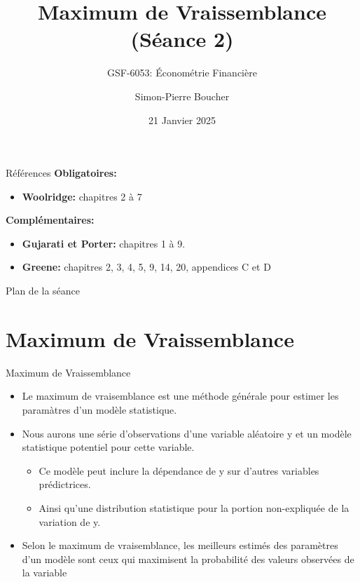 \documentclass{beamer}
\title[S02 Régression et MCO]{Maximum de Vraissemblance\\ (Séance 2)}
\subtitle{GSF-6053: Économétrie Financière}
\author[SP. Boucher]{Simon-Pierre Boucher\inst{1}}
\institute[Université Laval]
{
  \inst{1}%
  Département de finance, assurance et immobilier\\
  Faculté des sciences de l'administration\\
  Université Laval}
\date[Hiver 2025]{21 Janvier 2025}
\begin{document}
\begin{frame}
  \titlepage
\end{frame}


\begin{frame}{Références}
\textbf{Obligatoires:}
\begin{itemize}
\item \textbf{Woolridge:} chapitres 2 à 7
\end{itemize}
\vspace{0.5cm}
\textbf{Complémentaires:}
\begin{itemize}
\item \textbf{Gujarati et Porter:} chapitres 1 à 9.
\item \textbf{Greene:} chapitres 2, 3, 4, 5, 9, 14, 20, appendices C et D
\end{itemize}
\end{frame}


\begin{frame}{Plan de la séance}
  \tableofcontents
\end{frame}

\section{Maximum de Vraissemblance}

\frame{\tableofcontents[current]}

\begin{frame}{Maximum de Vraissemblance}
\begin{itemize}
\item Le maximum de vraisemblance est une méthode générale pour estimer les paramàtres d’un modèle statistique.
\item Nous aurons une série d’observations d’une variable aléatoire y et un modèle statistique potentiel pour cette variable.
\begin{itemize}
\item Ce modèle peut inclure la dépendance de y sur d’autres variables prédictrices.
\item Ainsi qu’une distribution statistique pour la portion non-expliquée de la variation de y.
\end{itemize}
\item Selon le maximum de vraisemblance, les meilleurs estimés des paramètres d’un modèle sont ceux qui maximisent la probabilité des valeurs observées de la variable
\end{itemize}
\end{frame}
\end{document}
